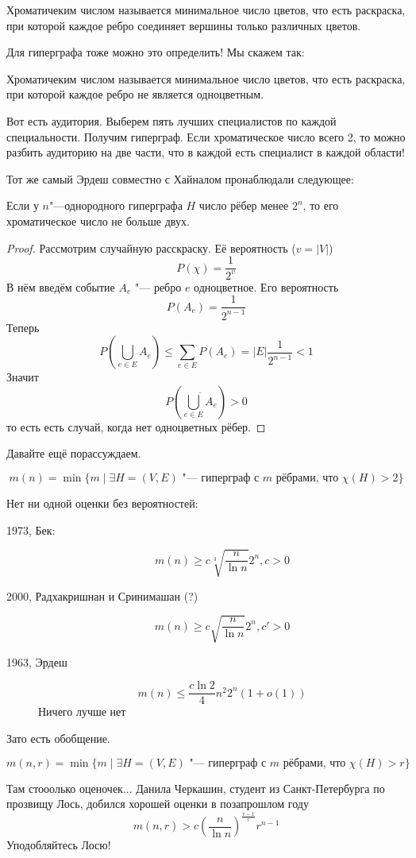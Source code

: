 \begin{Def}
	Хроматичеким числом называется минимальное число цветов, что есть раскраска, 
	при которой каждое ребро соединяет вершины только различных цветов.
\end{Def}

Для гиперграфа тоже можно это определить! Мы скажем так:
\begin{Def}
	Хроматичеким числом называется минимальное число цветов, что есть раскраска, 
	при которой каждое ребро не является одноцветным.
\end{Def}

\begin{exmp}
	Вот есть аудитория. 
	Выберем пять лучших специалистов по каждой специальности. 
	Получим гиперграф. 
	Если хроматическое число всего 2, то можно разбить аудиторию на две части, что в каждой есть специалист в каждой области!
\end{exmp}

Тот же самый Эрдеш совместно с Хайналом пронаблюдали следующее:

\begin{theorem}
	Если у $n$"---однородного гиперграфа $H$ число рёбер менее $2^n$, то его хроматическое число не больше двух.
\end{theorem}

\begin{proof}
	Рассмотрим случайную расскраску.
	Её вероятность ($v = |V|$)
	\[ P(\chi) = \frac1{2^v} \] 
	В нём введём событие $A_e$ "--- ребро $e$ одноцветное. 
	Его вероятность
	\[ P(A_e) = \frac1{2^{n-1}} \]
	Теперь
	\[ P\left(\bigcup_{e \in E} A_e\right) \le \sum_{e \in E} P(A_e) = |E| \frac1{2^{n-1}} < 1 \]
	Значит 
	\[ P\left(\overline{\bigcup_{e \in E} A_e}\right) > 0 \]
	то есть есть случай, когда нет одноцветных рёбер.
\end{proof}

Давайте ещё порассуждаем.

\begin{Def}
	\[m(n) = \min\{m \mid \text{$\exists H=(V, E)$ "--- гиперграф с $m$ рёбрами, что $\chi(H) > 2$}\} \]
\end{Def}

Нет ни одной оценки без вероятностей:
\begin{description}
\item[1973, Бек:]
	\[ m(n) \ge c \sqrt[3]{\frac{n}{\ln n}} 2^n, c > 0 \]

\item[2000, Радхакришнан и Сринимашан (?)]
	\[ m(n) \ge c \sqrt{\frac{n}{\ln n}} 2^n, c' > 0 \]

\item[1963, Эрдеш]
	\[ m(n) \le \frac{c \ln 2}{4} n^2 2^n (1 + o(1)) \]
	Ничего лучше нет
\end{description}

Зато есть обобщение.
\begin{Def}
	\[m(n, r) = \min\{m \mid \text{$\exists H=(V, E)$ "--- гиперграф с $m$ рёбрами, что $\chi(H) > r$}\} \]
\end{Def}
Там стооолько оценочек... Данила Черкашин, студент из Санкт-Петербурга по прозвищу Лось, добился хорошей оценки в позапрошлом году
\[ m(n, r) > c \left(\frac{n}{\ln n}\right)^\frac{r-1}r r^{n-1} \]
Уподобляйтесь Лосю!


